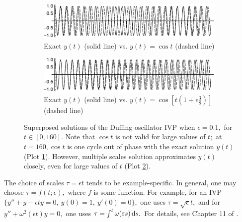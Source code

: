 \begin{figure}[h]
\captionsetup{width=\textwidth}
  \begin{subfigure}[t]{\textwidth}
    \centering
    \includegraphics[width=\linewidth]{figures/ExactvsApprox2.pdf}
    \caption{Exact $y(t)$ (solid line) vs. $y(t)=\cos t$ (dashed line)}
    \label{fig:PlotA}
  \end{subfigure}
  \begin{subfigure}[t]{\textwidth}
    \centering
    \includegraphics[width=\linewidth]{figures/ExactvsMscales2.pdf}
    \caption{Exact $y(t)$ (solid line) vs. $y(t) = \cos \left[ t(1 + \epsilon\frac{3}{8})\right]$ (dashed line)}
    \label{fig:PlotB}
  \end{subfigure}
  \caption[Solutions of Duffing oscillator IVP]{Superposed solutions of the Duffing oscillator IVP when $\epsilon = 0.1,$ for $t \in [0,160].$ Note that $\cos t$ is not valid for large values of $t;$ at $t = 160, \cos t$ is one cycle out of phase with the exact solution $y(t)$ (Plot \ref{fig:PlotA}). However, multiple scales solution approximates $y(t)$ closely, even for large values of $t$ (Plot \ref{fig:PlotB}).}
  \label{fig:MSfig}
\end{figure}

The choice of scales $\tau = \epsilon t$ tends to be example-specific. In general, one may choose $\tau = f(t; \epsilon),$ where $f$ is some function. For example, for an IVP $\{ y'' + y - \epsilon t y= 0, ~ y(0) = 1, ~ y'(0) = 0 \},$ one uses $\tau = \sqrt{\epsilon} t,$ and for $y''+ \omega^2(\epsilon t) y= 0,$ one uses $\tau = \int^t \omega (\varepsilon s) \,\mathrm{d} s.$ For details, see Chapter 11 of \cite{BO}.

